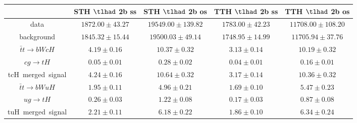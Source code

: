 \begin{table}
\begin{tabular}{|c|c|c|c|c|}
\end{tabular}
\begin{tabular}{|c|c|c|c|c|} \hline
 & STH $\tlhad$ 2b ss & STH $\tlhad$ 2b os & TTH $\tlhad$ 2b ss & TTH $\tlhad$ 2b os\\\hline
data & $1872.00\pm43.27$ & $19549.00\pm139.82$ & $1783.00\pm42.23$ & $11708.00\pm108.20$\\\hline
background & $1845.32\pm15.44$ & $19500.03\pm49.14$ & $1748.95\pm14.99$ & $11705.94\pm37.76$\\\hline
$\bar{t}t\to bWcH$ & $4.19\pm0.16$ & $10.37\pm0.32$ & $3.13\pm0.14$ & $10.19\pm0.32$\\\hline
$cg\to tH$ & $0.05\pm0.01$ & $0.28\pm0.02$ & $0.04\pm0.01$ & $0.16\pm0.01$\\\hline
tcH~merged~signal & $4.24\pm0.16$ & $10.64\pm0.32$ & $3.17\pm0.14$ & $10.36\pm0.32$\\\hline
$\bar{t}t\to bWuH$ & $1.95\pm0.11$ & $4.96\pm0.21$ & $1.69\pm0.10$ & $5.47\pm0.23$\\\hline
$ug\to tH$ & $0.26\pm0.03$ & $1.22\pm0.08$ & $0.17\pm0.03$ & $0.87\pm0.08$\\\hline
tuH~merged~signal & $2.21\pm0.11$ & $6.18\pm0.22$ & $1.86\pm0.10$ & $6.34\pm0.24$\\\hline
\end{tabular}
\label{tab:yield}
\end{table}
